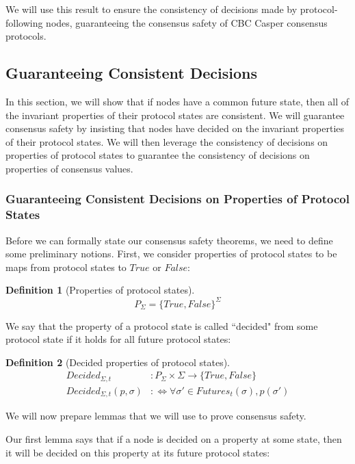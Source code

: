 \documentclass{article}
\theoremstyle{definition}
\newtheorem{defn}{Definition}[section]
\begin{document}
We will use this result to ensure the consistency of decisions made by protocol-following nodes, guaranteeing the consensus safety of CBC Casper consensus protocols.

\subsection{Guaranteeing Consistent Decisions}

In this section, we will show that if nodes have a common future state, then all of the invariant properties of their protocol states are consistent. We will guarantee consensus safety by insisting that nodes have decided on the invariant properties of their protocol states. We will then leverage the consistency of decisions on properties of protocol states to guarantee the consistency of decisions on properties of consensus values.

\subsubsection{Guaranteeing Consistent Decisions on Properties of Protocol States}

Before we can formally state our consensus safety theorems, we need to define some preliminary notions. First, we consider properties of protocol states to be maps from protocol states to $True$ or $False$:

\begin{defn}[Properties of protocol states]
$$
P_\Sigma = \{True, False\}^\Sigma  %
$$
\end{defn}

We say that the property of a protocol state is called ``decided" from some protocol state if it holds for all future protocol states:

\begin{defn}[Decided properties of protocol states]
\begin{align}
Decided_{\Sigma, t}&: P_\Sigma \times \Sigma \to \{True,False\} \\
Decided_{\Sigma, t}(p, \sigma) &:\Leftrightarrow \forall \sigma' \in Futures_t(\sigma), p(\sigma')
\end{align}
\end{defn}

We will now prepare lemmas that we will use to prove consensus safety.

Our first lemma says that if a node is decided on a property at some state, then it will be decided on this property at its future protocol states:
\end{document}
